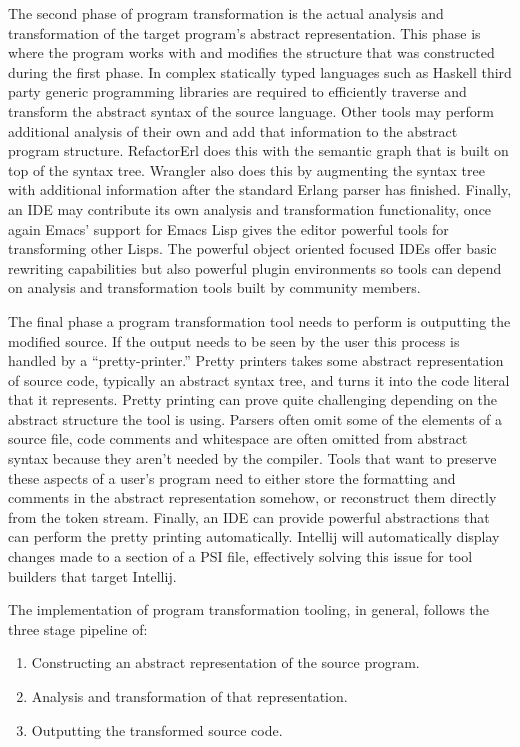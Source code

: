The second phase of program transformation is the actual analysis and transformation of the target program's abstract representation. This phase is where the program works with and modifies the structure that was constructed during the first phase. In complex statically typed languages such as Haskell third party generic programming libraries are required to efficiently traverse and transform the abstract syntax of the source language. Other tools may perform additional analysis of their own and add that information to the abstract program structure. RefactorErl does this with the semantic graph  that is built on top of the syntax tree. Wrangler also does this by augmenting the syntax tree with additional information after the standard Erlang parser has finished. Finally, an IDE may contribute its own analysis and transformation functionality, once again Emacs' support for Emacs Lisp gives the editor powerful tools for transforming other Lisps. The powerful object oriented focused IDEs offer basic rewriting capabilities but also powerful plugin environments so tools can depend on analysis and transformation tools built by community members.

The final phase a program transformation tool needs to perform is outputting the modified source. If the output needs to be seen by the user this process is handled by a ``pretty-printer.'' Pretty printers takes some abstract representation of source code, typically an abstract syntax tree, and turns it into the code literal that it represents. Pretty printing can prove quite challenging depending on the abstract structure the tool is using. Parsers often omit some of the elements of a source file, code comments and whitespace are often omitted from abstract syntax because they aren't needed by the compiler. Tools that want to preserve these aspects of a user's program need to either store the formatting and comments in the abstract representation somehow, or reconstruct them directly from the token stream. Finally, an IDE can provide powerful abstractions that can perform the pretty printing automatically. Intellij will automatically display changes made to a section of a PSI file, effectively solving this issue for tool builders that target Intellij.

The implementation of program transformation tooling, in general, follows the three stage pipeline of:

\begin{enumerate}
	\item Constructing an abstract representation of the source program.
	\item Analysis and transformation of that representation.
	\item Outputting the transformed source code.
\end{enumerate}

